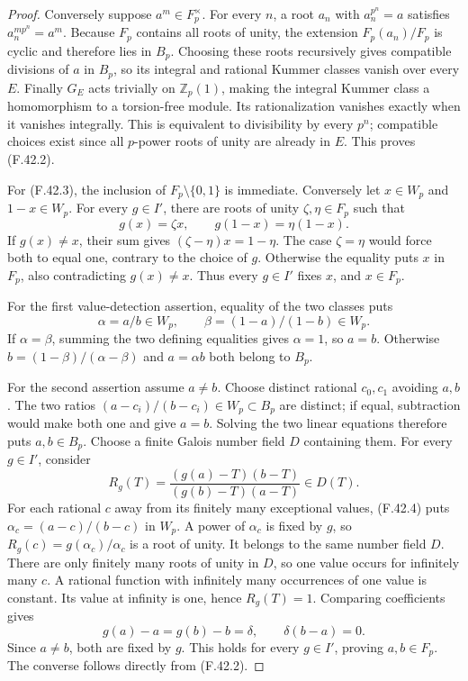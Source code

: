 \documentclass[11pt]{article}
\begin{document}
\begin{proof}
Conversely suppose \(a^m\in F_p^\times\).
For every \(n\), a root \(a_n\)
with \(a_n^{p^n}=a\) satisfies
\(a_n^{mp^n}=a^m\). Because
\(F_p\) contains all roots of
unity, the extension
\(F_p(a_n)/F_p\) is cyclic and
therefore lies in \(B_p\).
Choosing these roots recursively
gives compatible divisions of \(a\)
in \(B_p\), so its integral and
rational Kummer classes vanish
over every \(E\).
Finally \(G_E\) acts trivially on
\(\mathbb Z_p(1)\), making the
integral Kummer class a homomorphism
to a torsion-free module. Its
rationalization vanishes exactly
when it vanishes integrally. This
is equivalent to divisibility by
every \(p^n\); compatible choices
exist since all \(p\)-power roots
of unity are already in \(E\).
This proves (F.42.2).

For (F.42.3), the inclusion of
\(F_p\setminus\{0,1\}\) is immediate.
Conversely let \(x\in W_p\) and
\(1-x\in W_p\). For every
\(g\in I'\), there are roots
of unity \(\zeta,\eta\in F_p\)
such that
\[
                    g(x)=\zeta x,\qquad
                    g(1-x)=\eta(1-x).
\]
If \(g(x)\ne x\), their sum gives
\((\zeta-\eta)x=1-\eta\).
The case \(\zeta=\eta\) would
force both to equal one, contrary
to the choice of \(g\). Otherwise
the equality puts \(x\) in \(F_p\),
also contradicting \(g(x)\ne x\).
Thus every \(g\in I'\) fixes
\(x\), and \(x\in F_p\).

For the first value-detection assertion,
equality of the two classes puts
\[
                 \alpha=a/b\in W_p,\qquad
                 \beta=(1-a)/(1-b)\in W_p.
\]
If \(\alpha=\beta\), summing the
two defining equalities gives
\(\alpha=1\), so \(a=b\).
Otherwise
\(b=(1-\beta)/(\alpha-\beta)\)
and \(a=\alpha b\) both belong
to \(B_p\).

For the second assertion assume
\(a\ne b\). Choose distinct
rational \(c_0,c_1\) avoiding
\(a,b\). The two ratios
\((a-c_i)/(b-c_i)\in W_p\subset B_p\)
are distinct; if equal, subtraction
would make both one and give
\(a=b\). Solving the two linear
equations therefore puts
\(a,b\in B_p\).
Choose a finite Galois number field
\(D\) containing them. For every
\(g\in I'\), consider
\[
 R_g(T)=\frac{(g(a)-T)(b-T)}{(g(b)-T)(a-T)}
                                 \in D(T).
                                                        \tag{F.42.9}
\]
For each rational \(c\) away
from its finitely many exceptional
values, (F.42.4) puts
\(\alpha_c=(a-c)/(b-c)\) in
\(W_p\). A power of \(\alpha_c\)
is fixed by \(g\), so
\(R_g(c)=g(\alpha_c)/\alpha_c\)
is a root of unity. It belongs
to the same number field \(D\).
There are only finitely many roots
of unity in \(D\), so one value
occurs for infinitely many \(c\).
A rational function with infinitely
many occurrences of one value is
constant. Its value at infinity
is one, hence \(R_g(T)=1\).
Comparing coefficients gives
\[
              g(a)-a=g(b)-b=\delta,\qquad
              \delta(b-a)=0.
\]
Since \(a\ne b\), both are
fixed by \(g\). This holds
for every \(g\in I'\), proving
\(a,b\in F_p\). The converse
follows directly from (F.42.2).
\end{proof}
\end{document}
